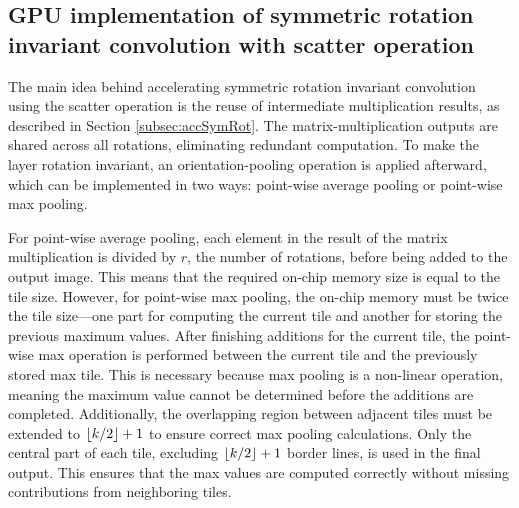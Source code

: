\subsection{GPU implementation of symmetric rotation invariant convolution with scatter operation}\label{sec:GPU}
The main idea behind accelerating symmetric rotation invariant convolution using the scatter operation is the reuse of intermediate multiplication results, as described in Section \ref{subsec:accSymRot}. The matrix-multiplication outputs are shared across all rotations, eliminating redundant computation.
To make the layer rotation invariant, an orientation-pooling operation is applied afterward, which can be implemented in two ways: point-wise average pooling or point-wise max pooling.

For point-wise average pooling, each element in the result of the matrix multiplication is divided by $r$, the number of rotations, before being added to the output image. This means that the required on-chip memory size is equal to the tile size. However, for point-wise max pooling, the on-chip memory must be twice the tile size—one part for computing the current tile and another for storing the previous maximum values. After finishing additions for the current tile, the point-wise max operation is performed between the current tile and the previously stored max tile. This is necessary because max pooling is a non-linear operation, meaning the maximum value cannot be determined before the additions are completed. Additionally, the overlapping region between adjacent tiles must be extended to $\lfloor k /2\rfloor + 1$ to ensure correct max pooling calculations.  Only the central part of each tile, excluding $\lfloor k /2\rfloor + 1$ border lines, is used in the final output. This ensures that the max values are computed correctly without missing contributions from neighboring tiles.

